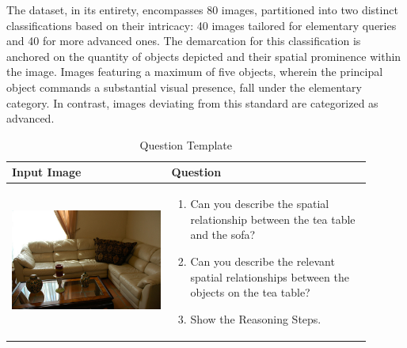 \documentclass[twocolumn,11pt]{report}
\begin{document}
The dataset, in its entirety, encompasses 80 images, partitioned into two distinct classifications based on their intricacy: 40 images tailored for elementary queries and 40 for more advanced ones. The demarcation for this classification is anchored on the quantity of objects depicted and their spatial prominence within the image. Images featuring a maximum of five objects, wherein the principal object commands a substantial visual presence, fall under the elementary category. In contrast, images deviating from this standard are categorized as advanced.

\begin{table}[ht]
    \centering
    \caption{Question Template}
    \label{tab:question_template_original}
    \begin{tabular}{|p{0.4\linewidth}|p{0.5\linewidth}|}
        \hline
        \textbf{Input Image} &\textbf{Question}\\
        \hline
        \begin{center} \includegraphics[width=\linewidth]{./pic/000000573553.jpg} \end{center}
        & \begin{enumerate}
            \item Can you describe the spatial relationship between the tea table and the sofa?
            \item Can you describe the relevant spatial relationships between the objects on the tea table?
            \item Show the Reasoning Steps.
        \end{enumerate}\\
        \hline
        \end{tabular}
\end{table}
\end{document}
